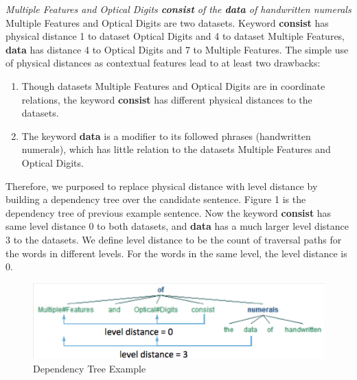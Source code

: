 \documentclass[10pt]{article}
\begin{document}
\textit{Multiple Features and Optical Digits \textbf{consist} of the \textbf{data} of handwritten numerals} \\

Multiple Features and Optical Digits are two datasets. Keyword \textbf{consist} has physical distance 1 to dataset Optical Digits and 4 to dataset Multiple Features, \textbf{data} has distance 4 to Optical Digits and 7 to Multiple Features. The simple use of physical distances as contextual features lead to at least two drawbacks:
\begin{enumerate}
\item Though datasets Multiple Features and Optical Digits are in coordinate relations, the keyword \textbf{consist} has different physical distances to the datasets.
\item The keyword \textbf{data} is a modifier to its followed phrases (handwritten numerals), which has little relation to the datasets Multiple Features and Optical Digits. 
\end{enumerate}
Therefore, we purposed to replace physical distance with level distance by building a dependency tree over the candidate sentence. Figure 1 is the dependency tree of previous example sentence. Now the keyword \textbf{consist} has same level distance 0 to both datasets, and \textbf{data} has a much larger level distance 3 to the datasets. We define level distance to be the count of traversal paths for the words in different levels. For the words in the same level, the level distance is 0.

\begin{figure}[t]\centering
\includegraphics[width=1.05\linewidth]{figures/level-distance.png}
\caption{Dependency Tree Example}
\vspace{-0.3cm}
\label{fig:view}
\end{figure}
\end{document}
